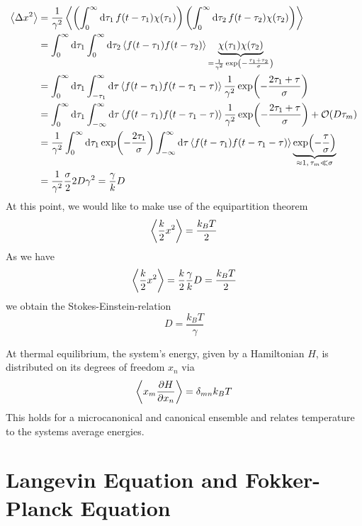 \documentclass{notebook}
\begin{document}
\begin{align*}
\expval{\Delta x^2} &= \frac{1}{\gamma^2} \expval{\left( \int_0^{\infty}{\dd{\tau_1} f(t-\tau_1) \chi(\tau_1)} \right) \left( \int_0^{\infty}{\dd{\tau_2} f(t-\tau_2) \chi(\tau_2)} \right)} \\
&= \int_0^{\infty} \dd{\tau_1} \int_0^{\infty} \dd{\tau_2} \expval{f(t-\tau_1) f(t-\tau_2)} \underbrace{\chi(\tau_1) \chi(\tau_2)}_{= \frac{1}{\gamma^2} \exp(- \frac{\tau_1 + \tau_2}{\sigma})} \\
&= \int_0^{\infty} \dd{\tau_1} \int_{-\tau_1}^{\infty} \dd{\tau} \expval{f(t-\tau_1) f(t-\tau_1 - \tau)}  \frac{1}{\gamma^2} \exp(- \frac{2\tau_1 + \tau}{\sigma}) \\
&= \int_0^{\infty} \dd{\tau_1} \int_{-\infty}^{\infty} \dd{\tau} \expval{f(t-\tau_1) f(t-\tau_1 - \tau)}  \frac{1}{\gamma^2} \exp(- \frac{2\tau_1 + \tau}{\sigma}) + \mathcal{O}(D\tau_m) \\
&= \frac{1}{\gamma^2} \int_0^{\infty} \dd{\tau_1} \exp(- \frac{2\tau_1}{\sigma}) \int_{-\infty}^{\infty} \dd{\tau} \expval{f(t-\tau_1) f(t-\tau_1 - \tau)} \underbrace{\exp(- \frac{\tau}{\sigma})}_{\approx 1, \, \tau_m \ll \sigma} \\
&= \frac{1}{\gamma^2} \frac{\sigma}{2} 2 D \gamma^2 = \frac{\gamma}{k}D
\end{align*}
%
At this point, we would like to make use of the equipartition theorem
%
\begin{equation}
\expval{\frac{k}{2}x^2} = \frac{k_B T}{2}
\end{equation}
%
As we have 
%
\begin{equation}
\expval{\frac{k}{2}x^2} = \frac{k}{2} \frac{\gamma}{k}D = \frac{k_B T}{2}
\end{equation}
%
we obtain the Stokes-Einstein-relation
%
\begin{equation}
D = \frac{k_B T}{\gamma}
\end{equation}
%
\begin{remark}
	At thermal equilibrium, the system's energy, given by a Hamiltonian $H$, is distributed on its degrees of freedom $x_n$ via
	\begin{equation}
	\expval{x_m \pdv{H}{x_n}} = \delta_{mn} k_B T
	\end{equation}
	This holds for a microcanonical and canonical ensemble and relates temperature to the systems average energies.
\end{remark}


\chapter{Langevin Equation and Fokker-Planck Equation}
\end{document}
